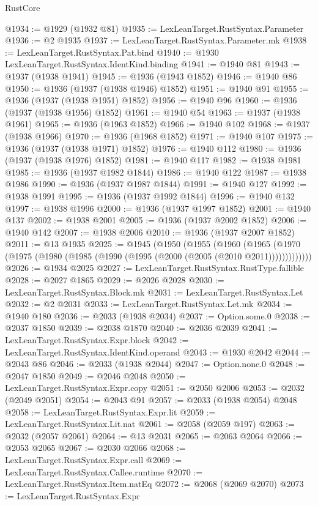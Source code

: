 \begin{lexlean}{RustCore}
\begin{coremodule}
@1934 := @1929 (@1932 @81)
@1935 := LexLeanTarget.RustSyntax.Parameter
@1936 := @2 @1935
@1937 := LexLeanTarget.RustSyntax.Parameter.mk
@1938 := LexLeanTarget.RustSyntax.Pat.bind
@1940 := @1930 LexLeanTarget.RustSyntax.IdentKind.binding
@1941 := @1940 @81
@1943 := @1937 (@1938 @1941)
@1945 := @1936 (@1943 @1852)
@1946 := @1940 @86
@1950 := @1936 (@1937 (@1938 @1946) @1852)
@1951 := @1940 @91
@1955 := @1936 (@1937 (@1938 @1951) @1852)
@1956 := @1940 @96
@1960 := @1936 (@1937 (@1938 @1956) @1852)
@1961 := @1940 @54
@1963 := @1937 (@1938 @1961)
@1965 := @1936 (@1963 @1852)
@1966 := @1940 @102
@1968 := @1937 (@1938 @1966)
@1970 := @1936 (@1968 @1852)
@1971 := @1940 @107
@1975 := @1936 (@1937 (@1938 @1971) @1852)
@1976 := @1940 @112
@1980 := @1936 (@1937 (@1938 @1976) @1852)
@1981 := @1940 @117
@1982 := @1938 @1981
@1985 := @1936 (@1937 @1982 @1844)
@1986 := @1940 @122
@1987 := @1938 @1986
@1990 := @1936 (@1937 @1987 @1844)
@1991 := @1940 @127
@1992 := @1938 @1991
@1995 := @1936 (@1937 @1992 @1844)
@1996 := @1940 @132
@1997 := @1938 @1996
@2000 := @1936 (@1937 @1997 @1852)
@2001 := @1940 @137
@2002 := @1938 @2001
@2005 := @1936 (@1937 @2002 @1852)
@2006 := @1940 @142
@2007 := @1938 @2006
@2010 := @1936 (@1937 @2007 @1852)
@2011 := @13 @1935
@2025 := @1945
    (@1950
      (@1955
        (@1960
          (@1965 (@1970 (@1975 (@1980 (@1985 (@1990 (@1995 (@2000 (@2005 (@2010 @2011)))))))))))))
@2026 := @1934 @2025
@2027 := LexLeanTarget.RustSyntax.RustType.fallible
@2028 := @2027 @1865
@2029 := @2026 @2028
@2030 := LexLeanTarget.RustSyntax.Block.mk
@2031 := LexLeanTarget.RustSyntax.Let
@2032 := @2 @2031
@2033 := LexLeanTarget.RustSyntax.Let.mk
@2034 := @1940 @180
@2036 := @2033 (@1938 @2034)
@2037 := Option.some.{0}
@2038 := @2037 @1850
@2039 := @2038 @1870
@2040 := @2036 @2039
@2041 := LexLeanTarget.RustSyntax.Expr.block
@2042 := LexLeanTarget.RustSyntax.IdentKind.operand
@2043 := @1930 @2042
@2044 := @2043 @86
@2046 := @2033 (@1938 @2044)
@2047 := Option.none.{0}
@2048 := @2047 @1850
@2049 := @2046 @2048
@2050 := LexLeanTarget.RustSyntax.Expr.copy
@2051 := @2050 @2006
@2053 := @2032 (@2049 @2051)
@2054 := @2043 @91
@2057 := @2033 (@1938 @2054) @2048
@2058 := LexLeanTarget.RustSyntax.Expr.lit
@2059 := LexLeanTarget.RustSyntax.Lit.nat
@2061 := @2058 (@2059 @197)
@2063 := @2032 (@2057 @2061)
@2064 := @13 @2031
@2065 := @2063 @2064
@2066 := @2053 @2065
@2067 := @2030 @2066
@2068 := LexLeanTarget.RustSyntax.Expr.call
@2069 := LexLeanTarget.RustSyntax.Callee.runtime
@2070 := LexLeanTarget.RustSyntax.Item.natEq
@2072 := @2068 (@2069 @2070)
@2073 := LexLeanTarget.RustSyntax.Expr

\end{coremodule}
\end{lexlean}
